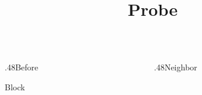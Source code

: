 \documentclass[11pt,aspectratio=169]{beamer}
\title{Probe}
\date{}
\begin{document}
\begin{frame}\begin{columns}[onlytextwidth]\begin{column}{.48\textwidth}Before\par \begin{block}{Block}\end{block}\end{column}\begin{column}{.48\textwidth}Neighbor\end{column}\end{columns}\end{frame}
\end{document}
